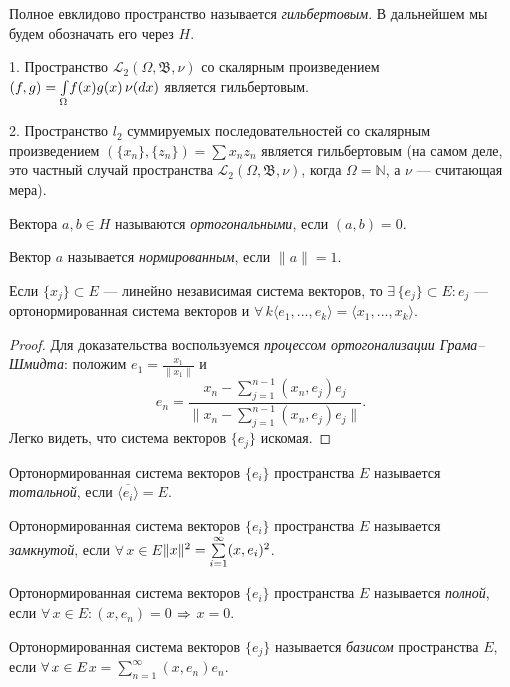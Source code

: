 \documentclass[10pt]{article}
\newcommand*{\p}[1]{#1\nobreak\discretionary{}{\hbox{$\mathsurround=0pt #1$}}{}}
\begin{document}
\begin{df}
Полное евклидово пространство называется \emph{гильбертовым}. В
дальнейшем мы будем обозначать его через $H$.
\end{df}

\begin{ex}


  1. Пространство $\mathcal{L}_2(\Omega,\mathfrak{B},\nu)$ со
  скалярным произведением
  $(f,g)\p=\int\limits_\Omega\!f(x)g(x)\,\nu(dx)$ является
  гильбертовым.

  2. Пространство $l_2$ суммируемых последовательностей со скалярным
  произведением $(\{x_n\},\{z_n\})=\sum x_nz_n$ является гильбертовым
  (на самом деле, это частный случай пространства
  $\mathcal{L}_2(\Omega,\mathfrak{B},\nu)$, когда $\Omega=\mathbb{N}$,
  а $\nu$ --- считающая мера).
\end{ex}
\begin{df}
Вектора $a,b\in H$ называются \emph{ортогональными}, если $(a,b)=0$.

Вектор $a$ называется \emph{нормированным}, если $\|a\|=1$.
\end{df}

\begin{prop}
Если $\{x_j\}\subset E$ --- линейно независимая система векторов, то
$\exists\,\{e_j\}\subset E:{e_j}$ --- ортонормированная система
векторов и $\forall\,k$\;\;$\langle e_1,\ldots,e_k\rangle=\langle
x_1,\ldots,x_k\rangle$.
\end{prop}

\begin{proof}
Для доказательства воспользуемся \emph{процессом ортогонализации
Грама--Шмидта}: положим $e_1=\frac{x_1}{\|x_1\|}$ и
$$e_n=\frac{x_n-\sum\limits_{j=1}^{n-1}
(x_n,e_j)e_j}{\Big\|x_n-\sum\limits_{j=1}^{n-1}
(x_n,e_j)e_j\Big\|}.$$ Легко видеть, что система векторов $\{e_j\}$
искомая.
\end{proof}

\begin{df}
Ортонормированная система векторов $\{e_i\}$ простра\-нства $E$
называется \emph{тотальной}, если $\overline{\langle e_i\rangle}=E$.
\end{df}

\begin{df}
  Ортонормированная система векторов $\{e_i\}$ пространства $E$
  называется \emph{замкнутой}, если $\forall\,x\in
  E$\;\;$\|x\|^2\p=\sum\limits_{i=1}^\infty (x,e_i)^2$.
\end{df}

\begin{df}
  Ортонормированная система векторов $\{e_i\}$ пространства $E$
  называется \emph{полной}, если $\forall\,x\in E: (x,e_n)=0$
  $\p\Rightarrow$ $x=0$.
\end{df}
\begin{df}
Ортонормированная система векторов $\{e_j\}$ называется
\emph{базисом} пространства $E$, если $\forall\,x\p\in
E$\;\;$x=\sum\limits_{n=1}^\infty (x,e_n)e_n$.
\end{df}
\end{document}
